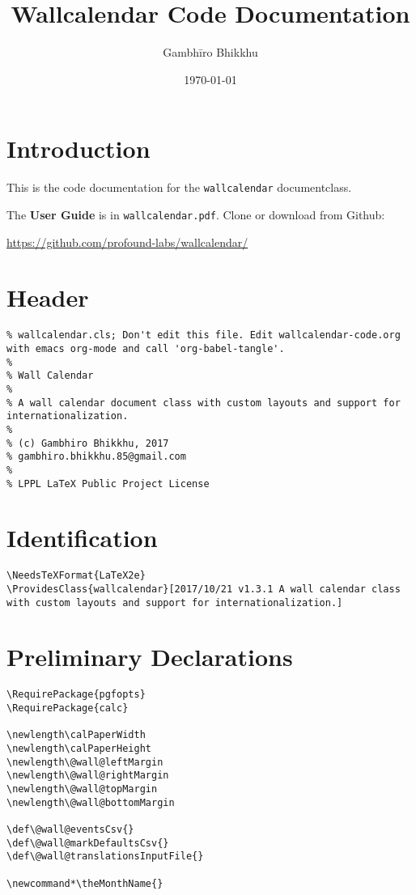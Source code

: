 \documentclass[11pt,oneside]{memoir-article}
\author{Gambhīro Bhikkhu}
\date{\today}
\title{Wallcalendar Code Documentation}
\begin{document}
\maketitle

\chapter{Introduction}
\label{sec:org96389a7}

\bigskip

This is the code documentation for the \texttt{wallcalendar} documentclass.

The \textbf{User Guide} is in \texttt{wallcalendar.pdf}. Clone or download from Github:

\href{https://github.com/profound-labs/wallcalendar/}{https://github.com/profound-labs/wallcalendar/}

\bigskip

\tableofcontents*

\clearpage

\chapter{Header}
\label{sec:org45bc02b}

\begin{verbatim}
% wallcalendar.cls; Don't edit this file. Edit wallcalendar-code.org with emacs org-mode and call 'org-babel-tangle'.
%
% Wall Calendar
%
% A wall calendar document class with custom layouts and support for internationalization.
%
% (c) Gambhiro Bhikkhu, 2017
% gambhiro.bhikkhu.85@gmail.com
%
% LPPL LaTeX Public Project License
\end{verbatim}

\chapter{Identification}
\label{sec:org29781fd}

\begin{verbatim}
\NeedsTeXFormat{LaTeX2e}
\ProvidesClass{wallcalendar}[2017/10/21 v1.3.1 A wall calendar class with custom layouts and support for internationalization.]
\end{verbatim}

\chapter{Preliminary Declarations}
\label{sec:org2ebd68a}

\begin{verbatim}
\RequirePackage{pgfopts}
\RequirePackage{calc}

\newlength\calPaperWidth
\newlength\calPaperHeight
\newlength\@wall@leftMargin
\newlength\@wall@rightMargin
\newlength\@wall@topMargin
\newlength\@wall@bottomMargin

\def\@wall@eventsCsv{}
\def\@wall@markDefaultsCsv{}
\def\@wall@translationsInputFile{}

\newcommand*\theMonthName{}
\end{verbatim}
\end{document}
